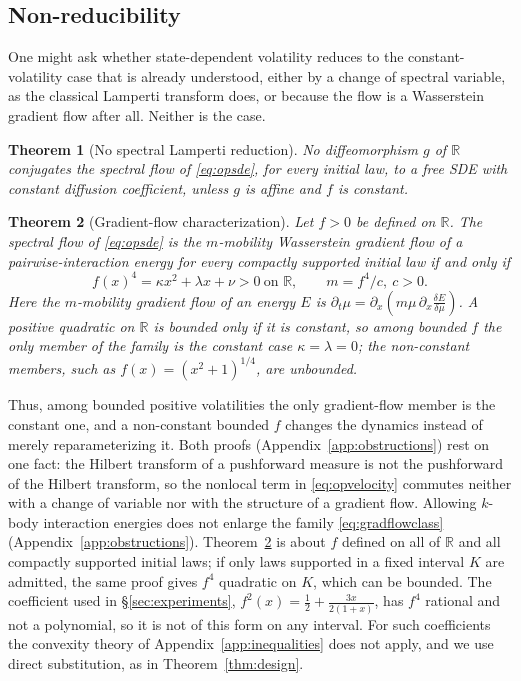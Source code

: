 \documentclass[11pt]{article}
\newcommand{\R}{\mathbb{R}}
\theoremstyle{plain}
\newtheorem{theorem}{Theorem}[section]
\theoremstyle{definition}
\theoremstyle{remark}
\begin{document}
\subsection{Non-reducibility}\label{sec:obstructions}

One might ask whether state-dependent volatility reduces to the constant-volatility case that
is already understood, either by a change of spectral variable, as the classical Lamperti
transform does, or because the flow is a Wasserstein gradient flow after all. Neither is the
case.

\begin{theorem}[No spectral Lamperti reduction]\label{thm:lamperti}
No diffeomorphism $g$ of $\R$ conjugates the spectral flow of \eqref{eq:opsde}, for
every initial law, to a free SDE with constant diffusion coefficient, unless $g$ is
affine and $f$ is constant.
\end{theorem}

\begin{theorem}[Gradient-flow characterization]\label{thm:nogradient}
Let $f>0$ be defined on $\R$. The spectral flow of \eqref{eq:opsde} is the $m$-mobility
Wasserstein gradient flow of a pairwise-interaction energy for every compactly supported
initial law \emph{if and only if}
\begin{equation}\label{eq:gradflowclass}
  f(x)^4 = \kappa x^2+\lambda x+\nu > 0\ \text{on } \R,\qquad m = f^4/c,\ c>0.
\end{equation}
Here the $m$-mobility gradient flow of an energy $E$ is $\partial_t\mu=\partial_x(m\mu\,\partial_x
\tfrac{\delta E}{\delta\mu})$. A positive quadratic on $\R$ is bounded only if it is constant, so
among bounded $f$ the only member of the family is the constant case $\kappa=\lambda=0$; the
non-constant members, such as $f(x)=(x^2+1)^{1/4}$, are unbounded.
\end{theorem}

Thus, among bounded positive volatilities the only gradient-flow member is the constant one, and a non-constant bounded $f$ changes the dynamics instead of merely reparameterizing it. Both proofs (Appendix~\ref{app:obstructions}) rest on one fact: the Hilbert transform of a pushforward measure is not the
pushforward of the Hilbert transform, so the nonlocal term in \eqref{eq:opvelocity} commutes neither with a change of variable
nor with the structure of a gradient flow. Allowing $k$-body interaction energies does not enlarge the family
\eqref{eq:gradflowclass} (Appendix~\ref{app:obstructions}). Theorem~\ref{thm:nogradient} is about $f$ defined on all of $\R$ and all
compactly supported initial laws; if only laws supported in a fixed interval $K$ are admitted, the same proof gives $f^4$ quadratic
on $K$, which can be bounded. The coefficient used in \S\ref{sec:experiments}, $f^2(x)=\tfrac12+\tfrac{3x}{2(1+x)}$, has $f^4$ rational
and not a polynomial, so it is not of this form on any interval. For such coefficients the convexity theory of
Appendix~\ref{app:inequalities} does not apply, and we use direct substitution, as in Theorem~\ref{thm:design}.
\end{document}

